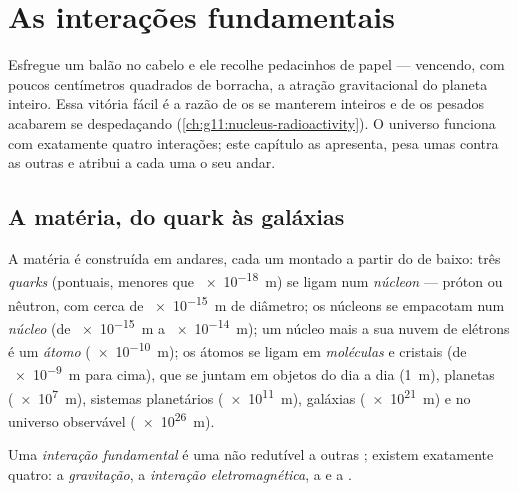 \chapter{As interações fundamentais}\label{ch:g11:fundamental-interactions}

Esfregue um balão no cabelo e ele recolhe pedacinhos de papel ---
vencendo, com poucos centímetros quadrados de borracha, a atração
gravitacional do planeta inteiro. Essa vitória fácil é a razão de os
 se manterem inteiros e de os  pesados acabarem se
despedaçando (\cref{ch:g11:nucleus-radioactivity}). O universo funciona
com exatamente quatro interações; este capítulo as apresenta, pesa umas
contra as outras e atribui a cada uma o seu andar.

\section{A matéria, do quark às galáxias}

\begin{definition}\label{def:g11:fundamental-interactions:ladder}
A matéria é construída em andares, cada um montado a partir do de baixo:
três \emph{quarks} (pontuais, menores que \qty{e-18}{m}) se
ligam num \emph{núcleon} --- próton ou nêutron, com cerca
de \qty{e-15}{m} de diâmetro; os núcleons se empacotam num
\emph{núcleo} (de \qty{e-15}{m} a \qty{e-14}{m}); um núcleo
mais a sua nuvem de elétrons é um \emph{átomo}
(\qty{e-10}{m}); os átomos se ligam em \emph{moléculas} e
cristais (de \qty{e-9}{m} para cima), que se juntam em objetos do dia a
dia (\qty{1}{m}), planetas (\qty{e7}{m}), sistemas planetários
(\qty{e11}{m}), galáxias (\qty{e21}{m}) e no universo observável
(\qty{e26}{m}).
\end{definition}

\begin{definition}\label{def:g11:fundamental-interactions:four}
Uma \emph{interação fundamental} é uma 
não redutível a outras ; existem exatamente quatro: a
\emph{gravitação}, a \emph{interação
eletromagnética}, a  e a
.
\end{definition}

